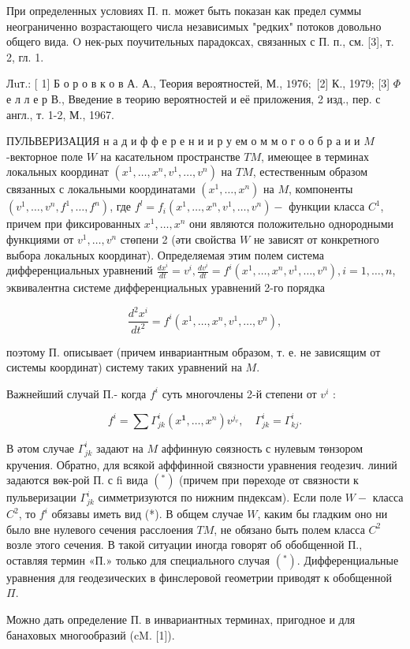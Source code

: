 \documentclass[10pt]{article}
\begin{document}
При определенных условиях П. п. может быть показан как предел суммы неограниченно возрастающего числа независимых "редких" потоков довольно общего вида. $\mathrm{O}$ нек-рых поучительных парадоксах, связанных с П. п., см. [3], т. 2, гл. 1.



Лuт.: [ 1] Б о р о в к о в А. А., Теория вероятностей, М., $1976 ;$ [2] К., 1979; [3] $\Phi$ е л л е р В., Введение в теорию вероятностей и её приложения, 2 изд., пер. с англ., т. 1-2, М., 1967.



ПУЛЬВЕРИЗАЦИЯ н а д и ф ф е р е н и и р у ем о м м о г о о б р а и и $M$-векторное поле $W$ на касательном пространстве $T M$, имеющее в терминах локальных координат $\left(x^{1}, \ldots, x^{n}, v^{1}, \ldots, v^{n}\right)$ на $T M$, естественным образом связанных с локальными координатами $\left(x^{1}, \ldots, x^{n}\right)$ на $M$, компоненты $\left(v^{1}, \ldots, v^{n}, f^{1}, \ldots, f^{n}\right)$, где $f^{l}=f_{i}\left(x^{1}, \ldots, x^{n}, v^{1}, \ldots, v^{n}\right)-$ функции класса $C^{1}$, причем при фиксированных $x^{1}, \ldots, x^{n}$ они являются положительно однородными функциями от $v^{1}, \ldots, v^{n}$ стөпени 2 (әти свойства $W$ не зависят от конкретного выбора локальных координат). Определяемая этим полем система дифференциальных уравнений $\frac{d x^{i}}{d t}=v^{i}, \frac{d v^{i}}{d t}=f^{i}\left(x^{1}, \ldots, x^{n}, v^{1}, \ldots, v^{n}\right), i=1, \ldots, n$, эквивалентна системе дифференциальных уравнений 2-го порядка



\[

\frac{d^{2} x^{i}}{d t^{2}}=f^{i}\left(x^{1}, \ldots, x^{n}, v^{1}, \ldots, v^{n}\right),

\]



поэтому П. описывает (причем инвариантным образом, т. е. не зависящим от системы координат) систему таких уравнений на $M$.



Важнейший случай П.- когда $f^{i}$ суть многочлены 2-й степени от $v^{i}$ :



\[

f^{i}=\sum \Gamma_{j k}^{i}\left(x^{\mathbf{1}}, \ldots, x^{n}\right) v^{j_{v}}, \quad \Gamma_{j k}^{i}=\Gamma_{k j}^{i} .

\]



В әтом случае $\Gamma_{j k}^{i}$ задают на $M$ аффинную сөязность с нулевым төнзором кручения. Обратно, для всякой афффинной связности уравнения геодезич. линий задаются вөк-рой П. с fi вида $\left(^{*}\right)$ (причем при пөреходе от связности к пульверизации $\Gamma_{j k}^{i}$ симметризуются по нижним пндексам). Если поле $W-$ класса $C^{2}$, то $f^{i}$ обязавы иметь вид (*). В общем случае $W$, каким бы гладким оно ни было вне нулевого сечения расслоения $T M$, не обязано быть полем класса $C^{2}$ возле этого сечения. В такой ситуации иногда говорят об обобщенной П., оставляя термин «П.» только для специального случая $\left(^{*}\right)$. Дифференциальные уравнения для геодезических в финслеровой геометрии приводят к обобщенной $\Pi$.



Можно дать определение П. в инвариантных терминах, пригодное и для банаховых многообразий (cM. [1]).
\end{document}
